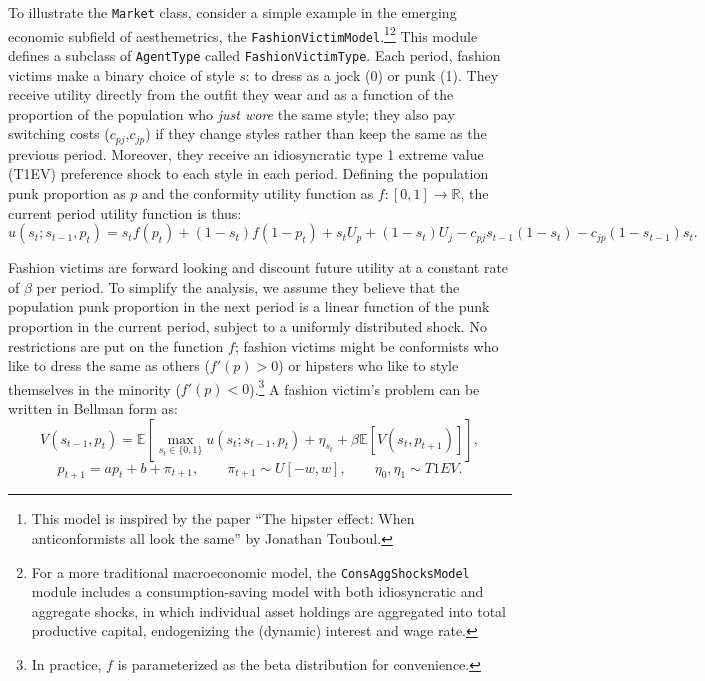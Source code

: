 \documentclass[12pt,titlepage,letterpaper]{econtex}
\newcommand{\E}{\mathbb{E}}
\begin{document}
To illustrate the \texttt{Market} class, consider a simple example in the emerging economic subfield of aesthemetrics, the \texttt{FashionVictimModel}.\footnote{This model is inspired by the paper ``The hipster effect: When anticonformists all look the same'' by Jonathan Touboul.}\footnote{For a more traditional macroeconomic model, the \texttt{ConsAggShocksModel} module includes a consumption-saving model with both idiosyncratic and aggregate shocks, in which individual asset holdings are aggregated into total productive capital, endogenizing the (dynamic) interest and wage rate.}  This module defines a subclass of \texttt{AgentType} called \texttt{FashionVictimType}.  Each period, fashion victims make a binary choice of style $s$: to dress as a jock (0) or punk (1).  They receive utility directly from the outfit they wear and as a function of the proportion of the population who \textit{just wore} the same style; they also pay switching costs ($c_{pj}$,$c_{jp}$) if they change styles rather than keep the same as the previous period.  Moreover, they receive an idiosyncratic type 1 extreme value (T1EV) preference shock to each style in each period.  Defining the population punk proportion as $p$ and the conformity utility function as $f:[0,1]\rightarrow \mathbb{R}$, the current period utility function is thus:
\begin{equation*}
u(s_t;s_{t-1},p_t) = s_t f(p_t) + (1-s_t) f(1-p_t) + s_t U_p + (1-s_t) U_j - c_{pj} s_{t-1}(1-s_t) - c_{jp}(1-s_{t-1})s_t.
\end{equation*}

Fashion victims are forward looking and discount future utility at a constant rate of $\beta$ per period.  To simplify the analysis, we assume they believe that the population punk proportion in the next period is a linear function of the punk proportion in the current period, subject to a uniformly distributed shock.  No restrictions are put on the function $f$; fashion victims might be conformists who like to dress the same as others ($f'(p) > 0$) or hipsters who like to style themselves in the minority ($f'(p) < 0$).\footnote{In practice, $f$ is parameterized as the beta distribution for convenience.}  A fashion victim's problem can be written in Bellman form as:
\begin{equation*}
V(s_{t-1},p_t) = \E \left[ \max_{s_t \in \{0,1\}} u(s_t;s_{t-1},p_t) + \eta_{s_t} + \beta \E \left[ V(s_t,p_{t+1}) \right] \right], 
\end{equation*}
\begin{equation*}
p_{t+1} = a p_t + b + \pi_{t+1}, \qquad \pi_{t+1} \sim U[-w,w], \qquad \eta_0,\eta_1 \sim T1EV.
\end{equation*}
\end{document}
